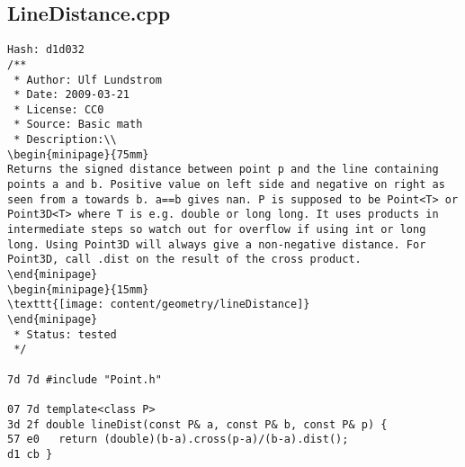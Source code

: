 \documentclass[11pt, a4paper, twoside]{article}
\begin{document}
\subsection{LineDistance.cpp}
\begin{lstlisting}
Hash: d1d032
/**
 * Author: Ulf Lundstrom
 * Date: 2009-03-21
 * License: CC0
 * Source: Basic math
 * Description:\\
\begin{minipage}{75mm}
Returns the signed distance between point p and the line containing points a and b. Positive value on left side and negative on right as seen from a towards b. a==b gives nan. P is supposed to be Point<T> or Point3D<T> where T is e.g. double or long long. It uses products in intermediate steps so watch out for overflow if using int or long long. Using Point3D will always give a non-negative distance. For Point3D, call .dist on the result of the cross product.
\end{minipage}
\begin{minipage}{15mm}
\texttt{[image: content/geometry/lineDistance]}
\end{minipage}
 * Status: tested
 */

7d 7d #include "Point.h"

07 7d template<class P>
3d 2f double lineDist(const P& a, const P& b, const P& p) {
57 e0 	return (double)(b-a).cross(p-a)/(b-a).dist();
d1 cb }
\end{lstlisting}
\end{document}
